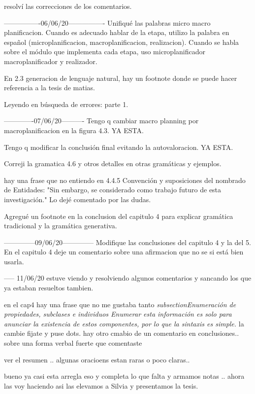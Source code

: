 resolví las correcciones de los comentarios.

----------------06/06/20----------------
Unifiqué las palabras micro macro planificacion. Cuando es adecuado hablar de la etapa, utilizo la palabra en español (microplanificacion, macroplanificacion, realizacion). Cuando se habla sobre el módulo que implementa cada etapa, uso microplanificador macroplanificador y realizador.

En 2.3 generacion de lenguaje natural, hay un footnote donde se puede hacer referencia a la tesis de matias.

Leyendo en búsqueda de errores: parte 1.


-------------07/06/20----------
Tengo q cambiar macro planning por macroplanificacion en la figura 4.3. YA ESTA.

Tengo q modificar la conclusión final evitando la autovaloracion. YA ESTA.

Correji la gramatica 4.6 y otros detalles en otras gramáticas y ejemplos.

hay una frase que no entiendo en 4.4.5 Convención y suposiciones del nombrado de Entidades: "Sin embargo, se considerado como trabajo futuro de esta investigación." Lo dejé comentado por las dudas. 

Agregué un footnote en la conclusion del capitulo 4 para explicar gramática tradicional y la gramática generativa.

--------------09/06/20--------------
Modifique las conclusiones del capitulo 4 y la del 5. En el capitulo 4 deje un comentario sobre una afirmacion que no se si está bien usarla. 

----- 11/06/20
estuve viendo y resolviendo algunos comentarios y sancando los que ya estaban resueltos tambien. 

en el cap4 hay una frase que no me gustaba tanto 
\textit{subsection{Enumeración de propiedades, subclases e individuos}
Enumerar esta información es solo para anunciar la existencia de estos componentes, por lo que la sintaxis es simple.
}
la cambie fijate y puse dots. 
hay otro cmabio de un comentario en conclusiones.. sobre una forma verbal fuerte que comentaste

ver el resumen .. algunas oracioens estan raras o poco claras..

bueno ya casi esta arregla eso y completa lo que falta y armamos notas .. ahora las voy haciendo asi las elevamos a Silvia y presentamos la tesis.



